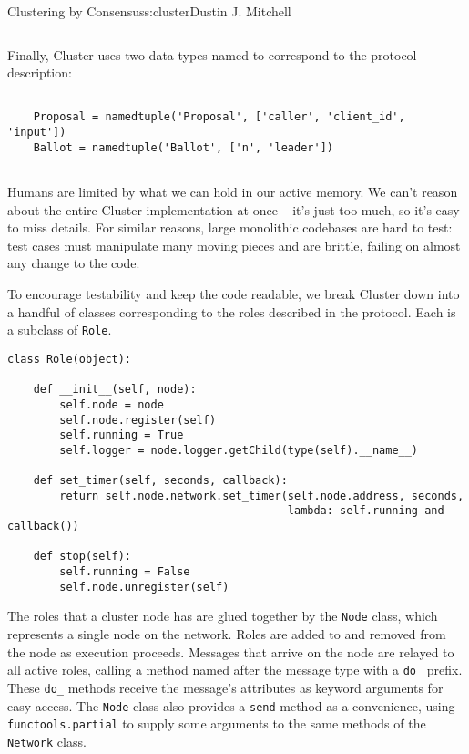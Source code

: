 \begin{aosachapter}{Clustering by Consensus}{s:cluster}{Dustin J. Mitchell}
\begin{verbatim}
\end{verbatim}

Finally, Cluster uses two data types named to correspond to the protocol
description:

\begin{verbatim}

    Proposal = namedtuple('Proposal', ['caller', 'client_id', 'input'])
    Ballot = namedtuple('Ballot', ['n', 'leader'])
    
\end{verbatim}

\label{component-model}

Humans are limited by what we can hold in our active memory. We can't
reason about the entire Cluster implementation at once -- it's just too
much, so it's easy to miss details. For similar reasons, large
monolithic codebases are hard to test: test cases must manipulate many
moving pieces and are brittle, failing on almost any change to the code.

To encourage testability and keep the code readable, we break Cluster
down into a handful of classes corresponding to the roles described in
the protocol. Each is a subclass of \texttt{Role}.

\begin{verbatim}
class Role(object):

    def __init__(self, node):
        self.node = node
        self.node.register(self)
        self.running = True
        self.logger = node.logger.getChild(type(self).__name__)

    def set_timer(self, seconds, callback):
        return self.node.network.set_timer(self.node.address, seconds,
                                           lambda: self.running and callback())

    def stop(self):
        self.running = False
        self.node.unregister(self)
\end{verbatim}

The roles that a cluster node has are glued together by the
\texttt{Node} class, which represents a single node on the network.
Roles are added to and removed from the node as execution proceeds.
Messages that arrive on the node are relayed to all active roles,
calling a method named after the message type with a \texttt{do\_}
prefix. These \texttt{do\_} methods receive the message's attributes as
keyword arguments for easy access. The \texttt{Node} class also provides
a \texttt{send} method as a convenience, using
\texttt{functools.partial} to supply some arguments to the same methods
of the \texttt{Network} class.


\end{aosachapter}
